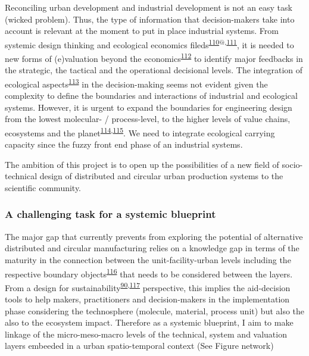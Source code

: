 \documentclass[
  11pt,
  a4paperpaper,
  onecolumn]{article}
\begin{document}
Reconciling urban development and industrial development is not an easy
task (wicked problem). Thus, the type of information that
decision-makers take into account is relevant at the moment to put in
place industrial systems. From systemic design thinking and ecological
economics
fileds\textsuperscript{\protect\hyperlink{ref-kish2021}{110}@,\protect\hyperlink{ref-economics2021}{111}},
it is needed to new forms of (e)valuation beyond the
economics\textsuperscript{\protect\hyperlink{ref-gunton2022}{112}} to
identify major feedbacks in the strategic, the tactical and the
operational decisional levels. The integration of ecological
aspects\textsuperscript{\protect\hyperlink{ref-kennedy2022}{113}} in the
decision-making seems not evident given the complexity to define the
boundaries and interactions of industrial and ecological systems.
However, it is urgent to expand the boundaries for engineering design
from the lowest molecular- / process-level, to the higher levels of
value chains, ecosystems and the
planet\textsuperscript{\protect\hyperlink{ref-Martinez-Hernandez2017}{114},\protect\hyperlink{ref-kurtz2021}{115}}.
We need to integrate ecological carrying capacity since the fuzzy front
end phase of an industrial systems.

The ambition of this project is to open up the possibilities of a new
field of socio-technical design of distributed and circular urban
production systems to the scientific community.

\hypertarget{a-challenging-task-for-a-systemic-blueprint}{%
\subsubsection{A challenging task for a systemic
blueprint}\label{a-challenging-task-for-a-systemic-blueprint}}

The major gap that currently prevents from exploring the potential of
alternative distributed and circular manufacturing relies on a knowledge
gap in terms of the maturity in the connection between the
unit-facility-urban levels including the respective boundary
objects\textsuperscript{\protect\hyperlink{ref-Abson2014}{116}} that
needs to be considered between the layers. From a design for
sustainability\textsuperscript{\protect\hyperlink{ref-Ceschin2016}{90},\protect\hyperlink{ref-SousaRocha2019}{117}}
perspective, this implies the aid-decision tools to help makers,
practitioners and decision-makers in the implementation phase
considering the technosphere (molecule, material, process unit) but also
the also to the ecosystem impact. Therefore as a systemic blueprint, I
aim to make linkage of the micro-meso-macro levels of the technical,
system and valuation layers embeeded in a urban spatio-temporal context
(See Figure network)
\end{document}

